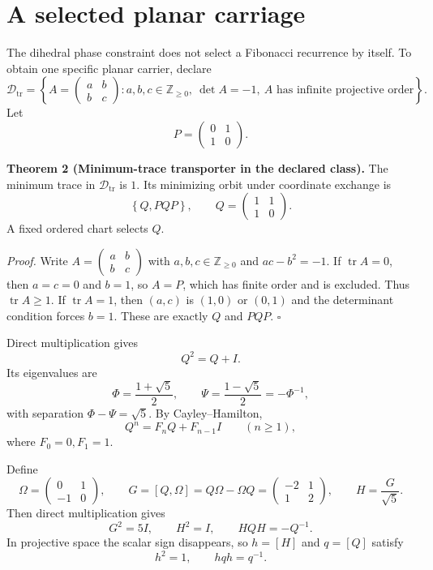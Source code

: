 \documentclass[11pt]{article}
\newcommand{\Z}{\mathbb Z}
\newcommand{\tr}{\operatorname{tr}}
\begin{document}
\section{A selected planar carriage}
The dihedral phase constraint does not select a Fibonacci recurrence by itself. To obtain one specific planar carrier, declare
\[
\mathcal D_{\mathrm{tr}}
=
\left\{
A=\begin{pmatrix}a&b\\b&c\end{pmatrix}:
 a,b,c\in\Z_{\ge0},\ \det A=-1,\ A\text{ has infinite projective order}
\right\}.
\]
Let
\[
P=\begin{pmatrix}0&1\\1&0\end{pmatrix}.
\]

\textbf{Theorem 2 (Minimum-trace transporter in the declared class).}
The minimum trace in $\mathcal D_{\mathrm{tr}}$ is $1$. Its minimizing orbit under coordinate exchange is
\[
\left\{Q,PQP\right\},
\qquad
Q=\begin{pmatrix}1&1\\1&0\end{pmatrix}.
\]
A fixed ordered chart selects $Q$.

\textit{Proof.}
Write $A=\left(\begin{smallmatrix}a&b\\b&c\end{smallmatrix}\right)$ with $a,b,c\in\Z_{\ge0}$ and $ac-b^2=-1$. If $\tr A=0$, then $a=c=0$ and $b=1$, so $A=P$, which has finite order and is excluded. Thus $\tr A\ge1$. If $\tr A=1$, then $(a,c)$ is $(1,0)$ or $(0,1)$ and the determinant condition forces $b=1$. These are exactly $Q$ and $PQP$. \hfill$\square$

Direct multiplication gives
\[
Q^2=Q+I.
\]
Its eigenvalues are
\[
\Phi=\frac{1+\sqrt5}{2},\qquad
\Psi=\frac{1-\sqrt5}{2}=-\Phi^{-1},
\]
with separation $\Phi-\Psi=\sqrt5$. By Cayley--Hamilton,
\[
Q^n=F_nQ+F_{n-1}I\qquad(n\ge1),
\]
where $F_0=0,F_1=1$.

Define
\[
\Omega=\begin{pmatrix}0&1\\-1&0\end{pmatrix},
\qquad
G=[Q,\Omega]=Q\Omega-\Omega Q
=\begin{pmatrix}-2&1\\1&2\end{pmatrix},
\qquad
H=\frac{G}{\sqrt5}.
\]
Then direct multiplication gives
\[
G^2=5I,\qquad H^2=I,\qquad HQH=-Q^{-1}.
\]
In projective space the scalar sign disappears, so $h=[H]$ and $q=[Q]$ satisfy
\[
h^2=1,\qquad hqh=q^{-1}.
\]
\end{document}
